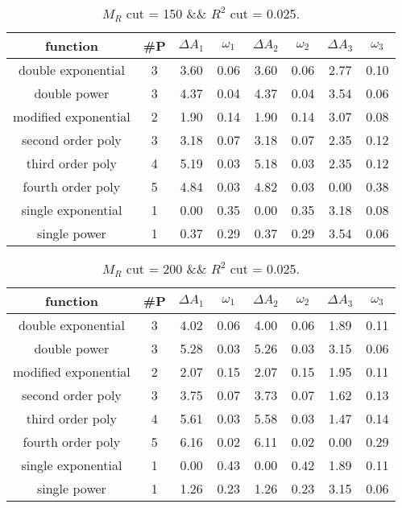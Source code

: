  
\begin{table}[H] 
\begin{center} 
\begin{tabular}{|c|c|cc|cc|cc|} 
\hline function & \#P & $\Delta A_1$ & $\omega_1$ & $\Delta A_2$ & $\omega_2$ & $\Delta A_3$ & $\omega_3$ \\ \hline 
double exponential &  3 &   3.60 &   0.06 &   3.60 &   0.06 &   2.77 &   0.10 \\ 
double power &  3 &   4.37 &   0.04 &   4.37 &   0.04 &   3.54 &   0.06 \\ 
modified exponential &  2 &   1.90 &   0.14 &   1.90 &   0.14 &   3.07 &   0.08 \\ 
second order poly &  3 &   3.18 &   0.07 &   3.18 &   0.07 &   2.35 &   0.12 \\ 
third order poly &  4 &   5.19 &   0.03 &   5.18 &   0.03 &   2.35 &   0.12 \\ 
fourth order poly &  5 &   4.84 &   0.03 &   4.82 &   0.03 &   0.00 &   0.38 \\ 
single exponential &  1 &   0.00 &   0.35 &   0.00 &   0.35 &   3.18 &   0.08 \\ 
single power &  1 &   0.37 &   0.29 &   0.37 &   0.29 &   3.54 &   0.06 \\ 
\hline 
\end{tabular} 
\caption{$M_R$ cut = 150 \&\& $R^2$ cut = 0.025.} 
\label{tab:FitChoices_150_0.025} 
\end{center} 
\end{table} 
 
 
\begin{table}[H] 
\begin{center} 
\begin{tabular}{|c|c|cc|cc|cc|} 
\hline function & \#P & $\Delta A_1$ & $\omega_1$ & $\Delta A_2$ & $\omega_2$ & $\Delta A_3$ & $\omega_3$ \\ \hline 
double exponential &  3 &   4.02 &   0.06 &   4.00 &   0.06 &   1.89 &   0.11 \\ 
double power &  3 &   5.28 &   0.03 &   5.26 &   0.03 &   3.15 &   0.06 \\ 
modified exponential &  2 &   2.07 &   0.15 &   2.07 &   0.15 &   1.95 &   0.11 \\ 
second order poly &  3 &   3.75 &   0.07 &   3.73 &   0.07 &   1.62 &   0.13 \\ 
third order poly &  4 &   5.61 &   0.03 &   5.58 &   0.03 &   1.47 &   0.14 \\ 
fourth order poly &  5 &   6.16 &   0.02 &   6.11 &   0.02 &   0.00 &   0.29 \\ 
single exponential &  1 &   0.00 &   0.43 &   0.00 &   0.42 &   1.89 &   0.11 \\ 
single power &  1 &   1.26 &   0.23 &   1.26 &   0.23 &   3.15 &   0.06 \\ 
\hline 
\end{tabular} 
\caption{$M_R$ cut = 200 \&\& $R^2$ cut = 0.025.} 
\label{tab:FitChoices_200_0.025} 
\end{center} 
\end{table} 
 
